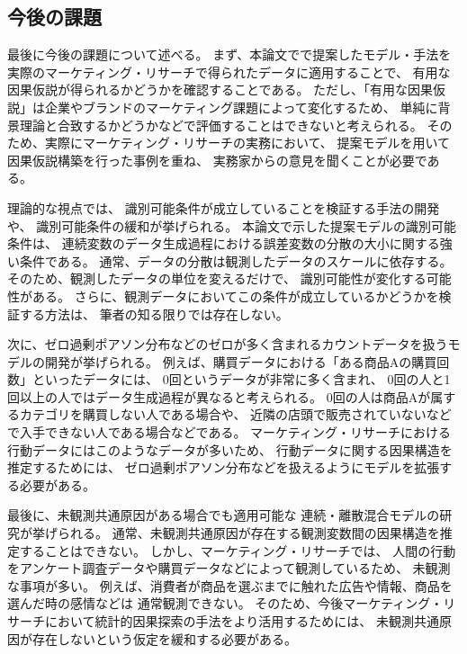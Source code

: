 
\subsection{今後の課題}

最後に今後の課題について述べる。
まず、本論文でで提案したモデル・手法を
実際のマーケティング・リサーチで得られたデータに適用することで、
有用な因果仮説が得られるかどうかを確認することである。
ただし、「有用な因果仮説」は企業やブランドのマーケティング課題によって変化するため、
単純に背景理論と合致するかどうかなどで評価することはできないと考えられる。
そのため、実際にマーケティング・リサーチの実務において、
提案モデルを用いて因果仮説構築を行った事例を重ね、
実務家からの意見を聞くことが必要である。

理論的な視点では、
識別可能条件が成立していることを検証する手法の開発や、
識別可能条件の緩和が挙げられる。
本論文で示した提案モデルの識別可能条件は、
連続変数のデータ生成過程における誤差変数の分散の大小に関する強い条件である。
通常、データの分散は観測したデータのスケールに依存する。
そのため、観測したデータの単位を変えるだけで、
識別可能性が変化する可能性がある。
さらに、観測データにおいてこの条件が成立しているかどうかを検証する方法は、
筆者の知る限りでは存在しない。

次に、ゼロ過剰ポアソン分布などのゼロが多く含まれるカウントデータを扱うモデルの開発が挙げられる。
例えば、購買データにおける「ある商品Aの購買回数」といったデータには、
0回というデータが非常に多く含まれ、
0回の人と1回以上の人ではデータ生成過程が異なると考えられる。
0回の人は商品Aが属するカテゴリを購買しない人である場合や、
近隣の店頭で販売されていないなどで入手できない人である場合などである。
マーケティング・リサーチにおける行動データにはこのようなデータが多いため、
行動データに関する因果構造を推定するためには、
ゼロ過剰ポアソン分布などを扱えるようにモデルを拡張する必要がある。

最後に、未観測共通原因がある場合でも適用可能な
連続・離散混合モデルの研究が挙げられる。
通常、未観測共通原因が存在する観測変数間の因果構造を推定することはできない。
しかし、マーケティング・リサーチでは、
人間の行動をアンケート調査データや購買データなどによって観測しているため、
未観測な事項が多い。
例えば、消費者が商品を選ぶまでに触れた広告や情報、商品を選んだ時の感情などは
通常観測できない。
そのため、今後マーケティング・リサーチにおいて統計的因果探索の手法をより活用するためには、
未観測共通原因が存在しないという仮定を緩和する必要がある。
